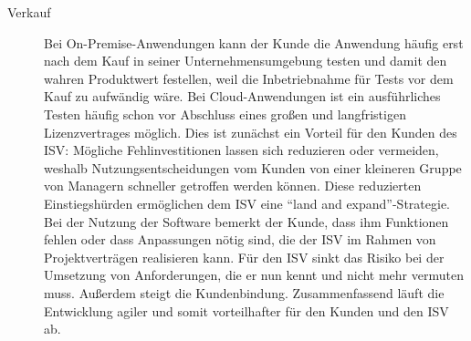 \begin{description}

	\item[Verkauf] Bei On-Premise-Anwendungen kann der Kunde die Anwendung
häufig erst nach dem Kauf in seiner Unternehmensumgebung testen und damit den
wahren Produktwert festellen, weil die Inbetriebnahme für Tests vor dem Kauf zu
aufwändig wäre. Bei Cloud-Anwendungen ist ein ausführliches Testen häufig schon 
vor Abschluss eines großen und langfristigen Lizenzvertrages möglich. Dies ist 
 zunächst ein Vorteil für den Kunden des ISV: Mögliche Fehlinvestitionen lassen 
sich reduzieren oder vermeiden, weshalb Nutzungsentscheidungen vom Kunden von 
einer kleineren Gruppe von Managern schneller getroffen werden können. Diese 
reduzierten Einstiegshürden ermöglichen dem ISV eine "`land and 
expand"'-Strategie. Bei der Nutzung der Software bemerkt der Kunde, dass ihm 
Funktionen fehlen oder dass Anpassungen nötig sind, die der ISV im Rahmen von 
Projektverträgen realisieren kann. Für den ISV sinkt das Risiko bei der 
Umsetzung von Anforderungen, die er nun kennt und nicht mehr vermuten muss. 
Außerdem steigt die Kundenbindung. Zusammenfassend läuft die Entwicklung agiler 
und somit vorteilhafter für den Kunden und den ISV ab.
\end{description}

